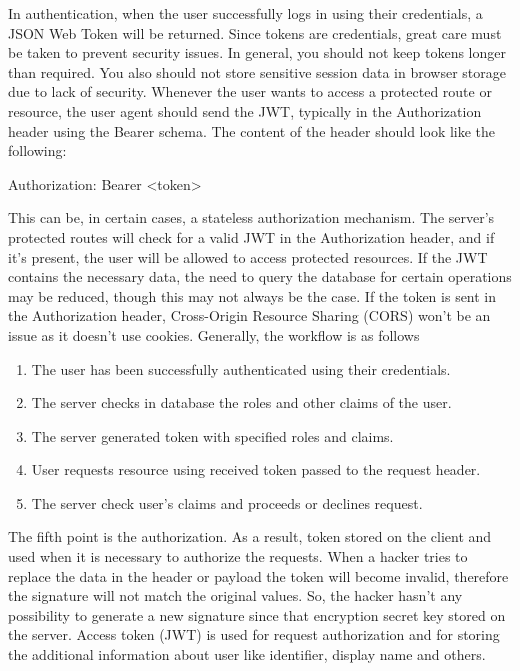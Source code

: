 In authentication, when the user successfully logs in using their credentials, a JSON Web Token will be returned.
Since tokens are credentials, great care must be taken to prevent security issues.
In general, you should not keep tokens longer than required.
You also should not store sensitive session data in browser storage due to lack of security.
Whenever the user wants to access a protected route or resource, the user agent should send the JWT,
typically in the Authorization header using the Bearer schema.
The content of the header should look like the following:
\begin{spverbatim}

    Authorization: Bearer <token>

\end{spverbatim}
This can be, in certain cases, a stateless authorization mechanism.
The server's protected routes will check for a valid JWT in the Authorization header, and if it's present,
the user will be allowed to access protected resources.
If the JWT contains the necessary data, the need to query the database for certain operations may be reduced,
though this may not always be the case.
If the token is sent in the Authorization header, Cross-Origin Resource Sharing (CORS) won't be an issue
as it doesn't use cookies.
Generally, the workflow is as follows
\begin{enumerate}
    \item The user has been successfully authenticated using their credentials.
    \item The server checks in database the roles and other claims of the user.
    \item The server generated token with specified roles and claims.
    \item User requests resource using received token passed to the request header.
    \item The server check user's claims and proceeds or declines request.
\end{enumerate}

The fifth point is the authorization.
As a result, token stored on the client and used when it is necessary to authorize the requests.
When a hacker tries to replace the data in the header or payload the token will become invalid,
therefore the signature will not match the original values.
So, the hacker hasn't any possibility to generate a new signature since that encryption secret key stored on the server.
Access token (JWT) is used for request authorization and for storing the additional information about user like identifier,
display name and others.

